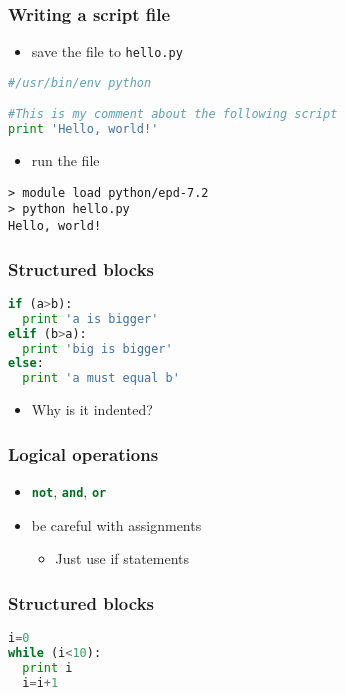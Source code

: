 \documentclass[xcolor=table,10pt,final]{beamer}
\begin{document}
\begin{frame}[fragile]
  \frametitle{Writing a script file}
  \begin{itemize}
    \item save the file to {\tt hello.py}
  \end{itemize}
\begin{lstlisting}[language=Python]
#/usr/bin/env python

#This is my comment about the following script
print 'Hello, world!'
\end{lstlisting}
\begin{itemize}
  \item run the file
\end{itemize}
\begin{verbatim}
> module load python/epd-7.2
> python hello.py
Hello, world!
\end{verbatim}
\end{frame}

\begin{frame}[fragile]
  \frametitle{Structured blocks}
  \begin{lstlisting}[language=Python]
if (a>b):
  print 'a is bigger'
elif (b>a):
  print 'big is bigger'
else:
  print 'a must equal b'
\end{lstlisting}
\begin{itemize}
  \item<2-> Why is it indented?
\end{itemize}
\end{frame}
\begin{frame}
  \frametitle{Logical operations}
  \begin{itemize}
    \item \lstinline[language=Python]|not|, \lstinline[language=Python]|and|, \lstinline[language=Python]|or|
    \item be careful with assignments
      \begin{itemize}
        \item Just use if statements
      \end{itemize}
  \end{itemize}
\end{frame}

\begin{frame}[fragile]
  \frametitle{Structured blocks}
  \begin{lstlisting}[language=Python]
i=0
while (i<10):
  print i
  i=i+1
\end{lstlisting}
\end{frame}
\end{document}
